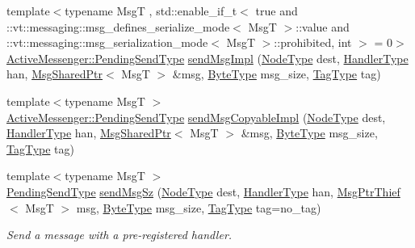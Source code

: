 \begin{DoxyCompactItemize}
\item 
{\footnotesize template$<$typename MsgT , std\+::enable\+\_\+if\+\_\+t$<$ true and \+::vt\+::messaging\+::msg\+\_\+defines\+\_\+serialize\+\_\+mode$<$ Msg\+T $>$\+::value and \+::vt\+::messaging\+::msg\+\_\+serialization\+\_\+mode$<$ Msg\+T $>$\+::prohibited, int $>$  = 0$>$ }\\\hyperlink{structvt_1_1messaging_1_1_active_messenger_a3626a6ca76d8ad4ec7c3b47a2c70d3a8}{Active\+Messenger\+::\+Pending\+Send\+Type} \hyperlink{structvt_1_1messaging_1_1_active_messenger_ae4d52bd4014fe9cfee3a60bf477fe998}{send\+Msg\+Impl} (\hyperlink{namespacevt_a866da9d0efc19c0a1ce79e9e492f47e2}{Node\+Type} dest, \hyperlink{namespacevt_af64846b57dfcaf104da3ef6967917573}{Handler\+Type} han, \hyperlink{structvt_1_1messaging_1_1_msg_shared_ptr}{Msg\+Shared\+Ptr}$<$ MsgT $>$ \&msg, \hyperlink{namespacevt_aab8d55968084610ce3b17057981e9300}{Byte\+Type} msg\+\_\+size, \hyperlink{namespacevt_a84ab281dae04a52a4b243d6bf62d0e52}{Tag\+Type} tag)
\item 
{\footnotesize template$<$typename MsgT $>$ }\\\hyperlink{structvt_1_1messaging_1_1_active_messenger_a3626a6ca76d8ad4ec7c3b47a2c70d3a8}{Active\+Messenger\+::\+Pending\+Send\+Type} \hyperlink{structvt_1_1messaging_1_1_active_messenger_ac678a223a96965cd5533ab945f66f28d}{send\+Msg\+Copyable\+Impl} (\hyperlink{namespacevt_a866da9d0efc19c0a1ce79e9e492f47e2}{Node\+Type} dest, \hyperlink{namespacevt_af64846b57dfcaf104da3ef6967917573}{Handler\+Type} han, \hyperlink{structvt_1_1messaging_1_1_msg_shared_ptr}{Msg\+Shared\+Ptr}$<$ MsgT $>$ \&msg, \hyperlink{namespacevt_aab8d55968084610ce3b17057981e9300}{Byte\+Type} msg\+\_\+size, \hyperlink{namespacevt_a84ab281dae04a52a4b243d6bf62d0e52}{Tag\+Type} tag)
\item 
{\footnotesize template$<$typename MsgT $>$ }\\\hyperlink{structvt_1_1messaging_1_1_active_messenger_a3626a6ca76d8ad4ec7c3b47a2c70d3a8}{Pending\+Send\+Type} \hyperlink{group__preregister_ga0d38199d7351ef980e166d8aaabe1be2}{send\+Msg\+Sz} (\hyperlink{namespacevt_a866da9d0efc19c0a1ce79e9e492f47e2}{Node\+Type} dest, \hyperlink{namespacevt_af64846b57dfcaf104da3ef6967917573}{Handler\+Type} han, \hyperlink{structvt_1_1messaging_1_1_msg_ptr_thief}{Msg\+Ptr\+Thief}$<$ MsgT $>$ msg, \hyperlink{namespacevt_aab8d55968084610ce3b17057981e9300}{Byte\+Type} msg\+\_\+size, \hyperlink{namespacevt_a84ab281dae04a52a4b243d6bf62d0e52}{Tag\+Type} tag=no\+\_\+tag)
\begin{DoxyCompactList}\small\item\em Send a message with a pre-\/registered handler. \end{DoxyCompactList}\item 

\end{DoxyCompactItemize}
